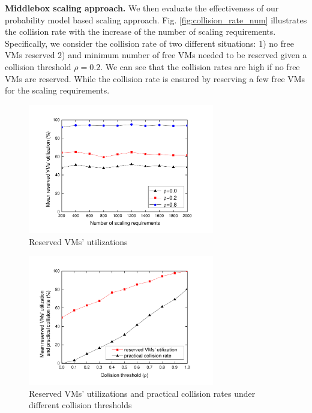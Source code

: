 \documentclass[review]{elsarticle}
\begin{document}
\textbf{Middlebox scaling approach.}
We then evaluate the effectiveness of our probability model based scaling approach. %
Fig. \ref{fig:collision_rate_num} illustrates the collision rate with the increase of the number of scaling requirements. Specifically, we consider the collision rate of two different situations: 1) no free VMs reserved 2) and minimum number of free VMs needed to be reserved given a collision threshold $\rho=0.2$. We can see that the collision rates are high if no free VMs are reserved. While the collision rate is ensured by reserving a few free VMs for the scaling requirements.
\begin{figure}%
	\centering 
	\includegraphics[width=3.2in]{fig/vm_util_num_p.pdf}	
	\caption{Reserved VMs' utilizations}
	\label{fig:vm_util_num_p}
\end{figure}
\begin{figure}%
	\centering
	\includegraphics[width=3.2in]{fig/vm_util_p.pdf}	
	\caption{Reserved VMs' utilizations
		and practical collision rates under different collision thresholds}
	\label{fig:vm_util_p}
\end{figure}
\end{document}
